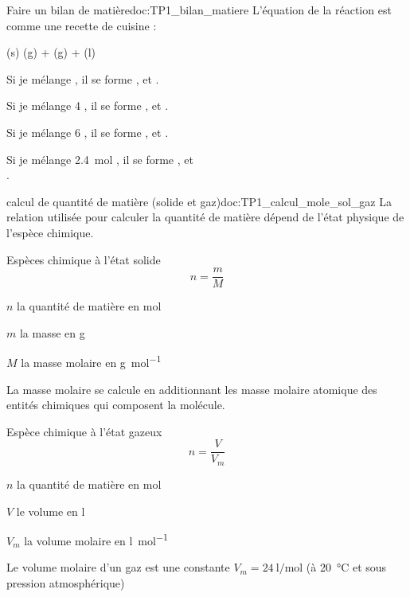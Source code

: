\begin{doc}{Faire un bilan de matière}{doc:TP1_bilan_matiere}
  L'équation de la réaction est comme une recette de cuisine :
  \begin{center}
    (s) \reaction
    (g) + (g) + (l)
  \end{center}
  Si je mélange  ,
  il se forme  ,
    et
   .
  
  Si je mélange 4 , il se forme  ,   et  .
  
  Si je mélange 6 , il se forme  ,   et  .
  
  Si je mélange \qty{2,4}{\mole} , il se forme
   ,
    et \\
   .
\end{doc}

\begin{doc}{calcul de quantité de matière (solide et gaz)}{doc:TP1_calcul_mole_sol_gaz}
  La relation utilisée pour calculer la quantité de matière dépend de l'état physique de l'espèce chimique.
  \begin{multicols}{2}
    Espèces chimique à l'état solide
    \begin{equation*}
      n = \dfrac{m}{M}
    \end{equation*}
    \begin{listePoints}
      \item $n$ la quantité de matière en \unit{\mole}
      \item $m$ la masse en \unit{\g}
      \item $M$ la masse molaire en \unit{\g\per\mole}
    \end{listePoints}
    La masse molaire se calcule en additionnant les masse molaire atomique des entités chimiques qui composent la molécule.
    
    Espèce chimique à l'état gazeux
    \begin{equation*}
      n = \dfrac{V}{V_m}
    \end{equation*}
    \begin{listePoints}
      \item $n$ la quantité de matière en \unit{\mole}
      \item $V$ le volume en \unit{\litre}
      \item $V_m$ la volume molaire en \unit{\litre\per\mole}
    \end{listePoints}
    Le volume molaire d'un gaz est une constante $V_m = \qty{24}{\litre\per\mole}$ (à \qty{20}{\degreeCelsius} et sous pression atmosphérique)
  \end{multicols}
\end{doc}

